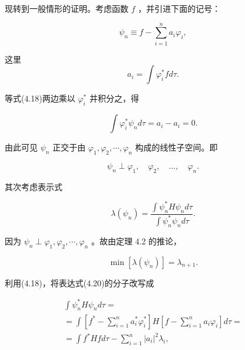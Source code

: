 现转到一般情形的证明。考虑函数 $f$ ，并引进下面的记号：

\begin{equation*}
\psi_ {n} \equiv f - \sum_ {i = 1} ^ {n} a _ {i} \varphi_ {i},\tag{4.18}
\end{equation*}

这里
\begin{equation*}
a _ {i} = \int \varphi_ {i} ^ {*} f d \tau .
\end{equation*}

等式(4.18)两边乘以 $\varphi_{i}^{*}$ 并积分之，得

\begin{equation*}
\int \varphi_ {i} ^ {*} \psi_ {n} d \tau = a _ {i} - a _ {i} = 0.\tag{4.19}
\end{equation*}

由此可见 $\psi_{n}$ 正交于由 $\varphi_{1}, \varphi_{2}, \cdots, \varphi_{n}$ 构成的线性子空间。即

\begin{equation*}
\psi_ {n} \perp \varphi_ {1}, \quad \varphi_ {2}, \quad \dots , \quad \varphi_ {n}.
\end{equation*}

其次考虑表示式

\begin{equation*}
\lambda (\psi_ {n}) = \frac {\int \psi_ {n} ^ {*} H \psi_ {n} d \tau}{\int \psi_ {n} ^ {*} \psi_ {n} d \tau}.\tag{4.20}
\end{equation*}

因为 $\psi_{n}\perp\varphi_{1},\varphi_{2},\cdots,\varphi_{n}$ 。故由定理 4.2 的推论，

\begin{equation*}
\min [ \lambda (\psi_ {n}) ] = \lambda_ {n + 1}.\tag{4.21}
\end{equation*}

利用(4.18)，将表达式(4.20)的分子改写成

\begin{equation*}
\begin{array}{l} \int \psi_ {n} ^ {*} H \psi_ {n} d \tau = \\ = \int \left[ f ^ {*} - \sum_ {i = 1} ^ {n} a _ {i} ^ {*} \varphi_ {i} ^ {*} \right] H \left[ f - \sum_ {i = 1} ^ {n} a _ {i} \varphi_ {i} \right] d \tau = \\ = \int f ^ {*} H f d \tau - \sum_ {i = 1} ^ {n} | a _ {i} | ^ {2} \lambda_ {i}, \end{array}\tag{4.22}
\end{equation*}

